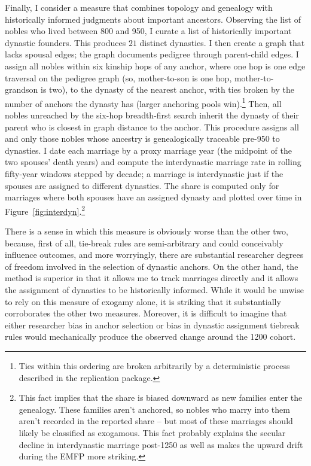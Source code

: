 \documentclass[12pt]{article}
\theoremstyle{definition}
\theoremstyle{remark}
\begin{document}
Finally, I consider a measure that combines topology and genealogy with historically informed judgments about important ancestors. Observing the list of nobles who lived between 800 and 950, I curate a list of historically important dynastic founders. This produces $21$ distinct dynasties. I then create a graph that lacks spousal edges; the graph documents pedigree through parent-child edges. I assign all nobles within six kinship hops of any anchor, where one hop is one edge traversal on the pedigree graph (so, mother-to-son is one hop, mother-to-grandson is two), to the dynasty of the nearest anchor, with ties broken by the number of anchors the dynasty has (larger anchoring pools win).\footnote{Ties within this ordering are broken arbitrarily by a deterministic process described in the replication package.} Then, all nobles unreached by the six-hop breadth-first search inherit the dynasty of their parent who is closest in graph distance to the anchor. This procedure assigns all and only those nobles whose ancestry is genealogically traceable pre-950 to dynasties. I date each marriage by a proxy marriage year (the midpoint of the two spouses' death years) and compute the interdynastic marriage rate in rolling fifty-year windows stepped by decade; a marriage is interdynastic just if the spouses are assigned to different dynasties. The share is computed only for marriages where both spouses have an assigned dynasty and plotted over time in Figure~\ref{fig:interdyn}.\footnote{This fact implies that the share is biased downward as new families enter the genealogy. These families aren't anchored, so nobles who marry into them aren't recorded in the reported share -- but most of these marriages should likely be classified as exogamous. This fact probably explains the secular decline in interdynastic marriage post-1250 as well as makes the upward drift during the EMFP more striking.}

There is a sense in which this measure is obviously worse than the other two, because, first of all, tie-break rules are semi-arbitrary and could conceivably influence outcomes, and more worryingly, there are substantial researcher degrees of freedom involved in the selection of dynastic anchors. On the other hand, the method is superior in that it allows me to track marriages directly and it allows the assignment of dynasties to be historically informed. While it would be unwise to rely on this measure of exogamy alone, it is striking that it substantially corroborates the other two measures. Moreover, it is difficult to imagine that either researcher bias in anchor selection or bias in dynastic assignment tiebreak rules would mechanically produce the observed change around the 1200 cohort.
\end{document}

